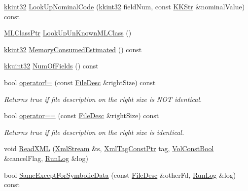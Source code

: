 \begin{DoxyCompactItemize}
\item 
\hyperlink{namespace_k_k_b_a8fa4952cc84fda1de4bec1fbdd8d5b1b}{kkint32} \hyperlink{class_k_k_m_l_l_1_1_file_desc_a59b0335b54bccce30a3838d463a84ba3}{Look\+Up\+Nominal\+Code} (\hyperlink{namespace_k_k_b_a8fa4952cc84fda1de4bec1fbdd8d5b1b}{kkint32} field\+Num, const \hyperlink{class_k_k_b_1_1_k_k_str}{K\+K\+Str} \&nominal\+Value) const 
\item 
\hyperlink{namespace_k_k_m_l_l_ac272393853d59e72e8456f14cd6d8c23}{M\+L\+Class\+Ptr} \hyperlink{class_k_k_m_l_l_1_1_file_desc_af14b8f9f30c5f9114af2de14a7f8a5b2}{Look\+Up\+Un\+Known\+M\+L\+Class} ()
\item 
\hyperlink{namespace_k_k_b_a8fa4952cc84fda1de4bec1fbdd8d5b1b}{kkint32} \hyperlink{class_k_k_m_l_l_1_1_file_desc_a8582ba3edb0a1d6a48bf9f362fcd2e04}{Memory\+Consumed\+Estimated} () const 
\item 
\hyperlink{namespace_k_k_b_af8d832f05c54994a1cce25bd5743e19a}{kkuint32} \hyperlink{class_k_k_m_l_l_1_1_file_desc_a07abdfb77949dee565c555c7651581c2}{Num\+Of\+Fields} () const 
\item 
bool \hyperlink{class_k_k_m_l_l_1_1_file_desc_a6c1b42643f0eb08a685c06d45432b419}{operator!=} (const \hyperlink{class_k_k_m_l_l_1_1_file_desc}{File\+Desc} \&right\+Size) const 
\begin{DoxyCompactList}\small\item\em Returns true if file description on the right size is N\+OT identical. \end{DoxyCompactList}\item 
bool \hyperlink{class_k_k_m_l_l_1_1_file_desc_a12b657887b19adec8ea0c094268cd37f}{operator==} (const \hyperlink{class_k_k_m_l_l_1_1_file_desc}{File\+Desc} \&right\+Size) const 
\begin{DoxyCompactList}\small\item\em Returns true if file description on the right size is identical. \end{DoxyCompactList}\item 
void \hyperlink{class_k_k_m_l_l_1_1_file_desc_a27d7b777aa1350f3959b069b76ede4c7}{Read\+X\+ML} (\hyperlink{class_k_k_b_1_1_xml_stream}{Xml\+Stream} \&s, \hyperlink{namespace_k_k_b_a5f1b0b1667d79fec26deeff10c43df23}{Xml\+Tag\+Const\+Ptr} tag, \hyperlink{namespace_k_k_b_a7d390f568e2831fb76b86b56c87bf92f}{Vol\+Const\+Bool} \&cancel\+Flag, \hyperlink{class_k_k_b_1_1_run_log}{Run\+Log} \&log)
\item 
bool \hyperlink{class_k_k_m_l_l_1_1_file_desc_af6f2e91a57a645694ee095018a2f1aff}{Same\+Except\+For\+Symbolic\+Data} (const \hyperlink{class_k_k_m_l_l_1_1_file_desc}{File\+Desc} \&other\+Fd, \hyperlink{class_k_k_b_1_1_run_log}{Run\+Log} \&log) const 

\end{DoxyCompactItemize}

